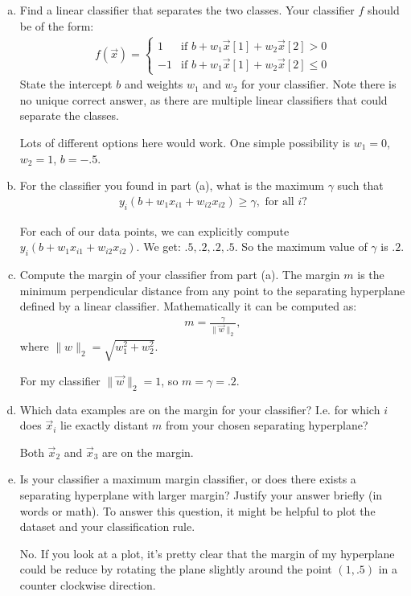 \documentclass[10pt]{article}
\begin{document}
\begin{enumerate}[(a)]
	\item Find a linear classifier that separates the two classes.
	Your classifier $f$ should be of the form:
	\begin{align*}
	f(\vec{x}) = \begin{cases}
	1 & \text{if } b + w_1 \vec{x}[1] + w_2 \vec{x}[2] > 0 \\
	-1 & \text{if } b + w_1 \vec{x}[1] + w_2 \vec{x}[2] \leq 0
	\end{cases}
	\end{align*}
	State the intercept $b$ and weights $w_1$ and $w_2$ for your classifier.
	Note there is no unique correct answer, as there are multiple linear classifiers
	that could separate the classes.
	
	\color{blue}
	Lots of different options here would work. One simple possibility is $w_1 = 0$, $w_2 = 1$, $b = -.5$.
	\color{black}
	
	
	\item For the classifier you found in part (a), what is the maximum $\gamma$ such that
	\begin{align*}
	y_i(b+w_1x_{i1} + w_{i2}x_{i2}) \geq \gamma, \mbox{ for all } i?
	\end{align*}
	
	\color{blue}
	For each of our data points, we can explicitly compute $y_i(b+w_1x_{i1} + w_{i2}x_{i2})$. We get: $.5, .2, .2, .5$. So the maximum value of $\gamma$ is $.2$.
	\color{black}
	
	\item Compute the margin of your classifier from part (a). The margin $m$ is the minimum perpendicular distance from any point to the separating hyperplane defined by a linear classifier. Mathematically it can be computed as:
	\begin{align*}
	m = \frac{\gamma}{\|\vec{w}\|_2},
	\end{align*}
	where $\|w\|_2 = \sqrt{w_1^2 + w_2^2}$.
	
	\color{blue}
	For my classifier $\|\vec{w}\|_2 = 1$, so $m = \gamma  = .2$.
	\color{black}
	
	\item Which data examples are on the margin for your classifier? I.e. for which $i$ does $\vec{x}_i$ lie exactly distant $m$ from your chosen separating hyperplane?	
	
	\color{blue}
Both $\vec{x}_2$ and $\vec{x}_3$ are on the margin.
	\color{black}
	
	\item Is your classifier a maximum margin classifier, or does there exists a separating hyperplane with larger margin? Justify your answer briefly (in words or math). To answer this question, it might be helpful to plot the dataset and your classification rule. 
	
		\color{blue}
No. If you look at a plot, it's pretty clear that the margin of my hyperplane could be reduce by rotating the plane slightly around  the point $(1,.5)$ in a counter clockwise direction. 
	\color{black}
\end{enumerate}
\end{document}
